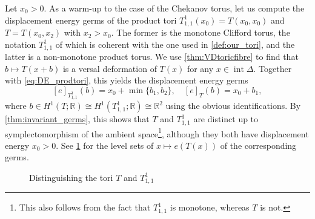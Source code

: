 \documentclass[AIF,Unicode,manuscript]{cedram}
\DeclareMathOperator{\interior}{int}
\begin{document}
Let $x_0>0$.
As a warm-up to the case of the Chekanov torus, let us compute the displacement energy germs of the product tori $T_{1,1}^1(x_0) = T(x_0,x_0)$ and $T = T(x_0,x_2)$ with $x_2 > x_0$.
The former is the monotone Clifford torus, the notation $T^1_{1,1}$ of which is coherent with the one used in \cref{def:our_tori}, and the latter is a non-monotone product torus.
We use \cref{thm:VDtoricfibre} to find that $b \mapsto T(x+b)$ is a versal deformation of $T(x)$ for any $x \in \interior \Delta$.
Together with \eqref{eq:DE_prodtori}, this yields the displacement energy germs
\begin{equation}
    \label{eq:babyDEG1}
    [e]_{T^1_{1,1}}(b) = x_0 + \min\{ b_1,b_2 \}, \quad
    [e]_{T}(b) = x_0 + b_1,
\end{equation}
where $b \in H^1(T;\mathbb{R}) \cong H^1(T^1_{1,1};\mathbb{R}) \cong \mathbb{R}^2$ using the obvious identifications.
By \cref{thm:invariant_germs}, this shows that $T$ and $T_{1,1}^1$ are distinct up to symplectomorphism of the ambient space\footnote{This also follows from the fact that $T^1_{1,1}$ is monotone, whereas $T$ is not.}, although they both have displacement energy $x_0 > 0$.
See \cref{fig:babys_first_vd} for the level sets of $x \mapsto e(T(x))$ of the corresponding germs.

\begin{figure}
  \centering
  \caption{Distinguishing the tori $T$ and $T^1_{1,1}$}
  \label{fig:babys_first_vd}
\end{figure}
\end{document}
